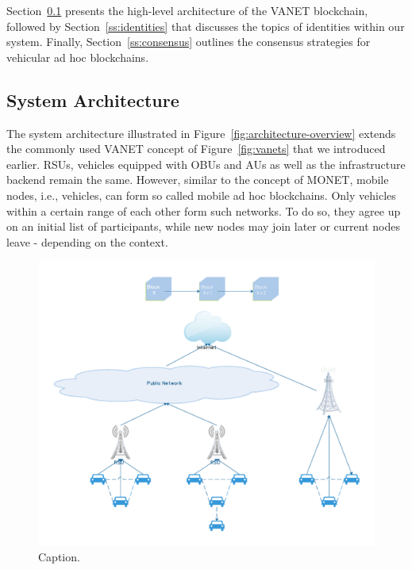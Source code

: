 \documentclass{llncs}
\begin{document}
{		Section~\ref{ss:architecture-overview} presents the high-level architecture of the VANET blockchain, followed by Section~\ref{ss:identities} that discusses the topics of identities within our system. Finally, Section~\ref{ss:consensus} outlines the consensus strategies for vehicular ad hoc blockchains.
		
		
		\subsection{System Architecture}
			\label{ss:architecture-overview}
			
			The system architecture illustrated in Figure~\ref{fig:architecture-overview} extends the commonly used VANET concept of Figure~\ref{fig:vanets} that we introduced earlier. RSUs, vehicles equipped with OBUs and AUs as well as the infrastructure backend remain the same. However, similar to the concept of MONET, mobile nodes, i.e., vehicles, can form so called mobile ad hoc blockchains. Only vehicles within a certain range of each other form such networks. To do so, they agree up on an initial list of participants, while new nodes may join later or current nodes leave - depending on the context.		
			\begin{figure}[H]
				\centering
				\includegraphics[scale=0.5]{Figures/20180904_monet-vanet.pdf}
				\caption{Caption.}

\end{figure}}
\end{document}
